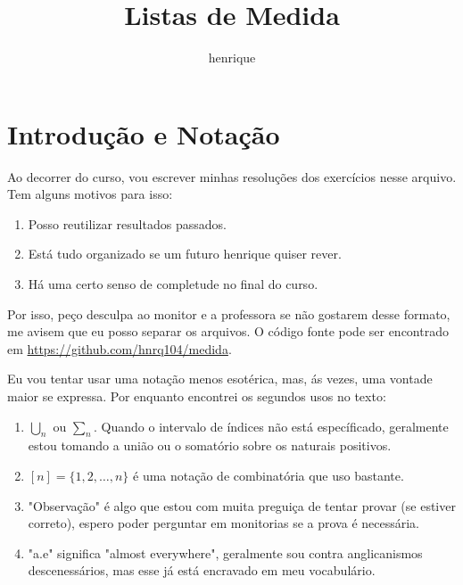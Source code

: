 \documentclass{article}
\author{henrique}
\title{Listas de Medida}
\theoremstyle{definition}
\begin{document}
\maketitle

\tableofcontents
\setcounter{section}{-1}

\section{Introdução e Notação}
Ao decorrer do curso, vou escrever minhas resoluções dos exercícios nesse arquivo. Tem alguns motivos para isso:
\begin{enumerate}
	\item Posso reutilizar resultados passados.
	\item Está tudo organizado se um futuro henrique quiser rever.
	\item Há uma certo senso de completude no final do curso.
\end{enumerate}
Por isso, peço desculpa ao monitor e a professora se não gostarem desse formato, me avisem que eu posso separar os arquivos.
O código fonte pode ser encontrado em \url{https://github.com/hnrq104/medida}.

Eu vou tentar usar uma notação menos esotérica, mas, ás vezes, uma vontade maior se expressa. Por enquanto encontrei os segundos usos no texto:
\begin{enumerate}
	\item $\bigcup_n$ ou $\sum_n$. Quando o intervalo de índices não está específicado, geralmente estou tomando a união ou o somatório
	sobre os naturais positivos.
	\item $[n] = \{1,2,\dots, n\}$ é uma notação de combinatória que uso bastante.
	\item "Observação" é algo que estou com muita preguiça de tentar provar (se estiver correto), 
	espero poder perguntar em monitorias se a prova é necessária.
	\item "a.e" significa "almost everywhere", geralmente sou contra anglicanismos descenessários, mas
	esse já está encravado em meu vocabulário.
\end{enumerate}









\end{document}
